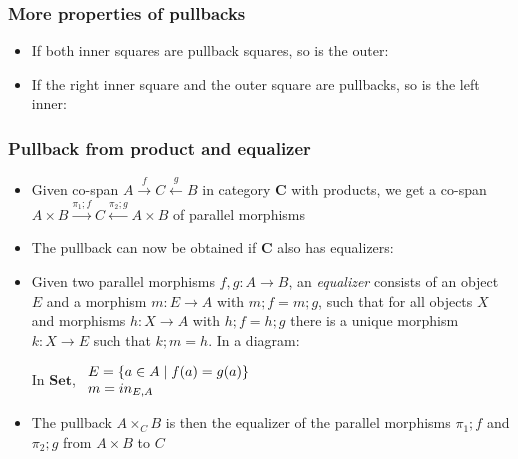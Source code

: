 \documentclass[handout]{beamer}
\newcommand{\bfsf}[1]{{\boldsymbol{#1}}}
\newcommand{\Set}{\bfsf{Set}}
\newcommand{\CC}{\bfsf{C}}
\begin{document}
\frame
  {   
    \frametitle{More properties of pullbacks}\label{Ch4:PullbPropMore}

 \begin{itemize}[<+->]
\item If both inner squares are pullback squares, so is the outer:
\item If the right inner square and the outer square are pullbacks, so is the left inner:
 \end{itemize}

 }


\frame
  {   
    \frametitle{Pullback from product and equalizer}\label{Ch4:PullbProdEq}

 \begin{itemize}[<+->]
\item Given co-span $A\stackrel{f}{\to} C\stackrel{g}{\leftarrow}B$ in 
category $\CC$ with products, we get a co-span
$A\times B\stackrel{\pi_1;f}{\to} C\stackrel{\pi_2;g}{\leftarrow}A\times B$
of parallel morphisms
\item The pullback can now be obtained if $\CC$ also has equalizers:
\item Given two parallel morphisms $f,g: A\to B$, an \emph{equalizer}
consists of an object $E$ and a morphism $m:E\to A$ with $m;f=m;g$,
such that for all objects $X$ and morphisms $h:X\to A$ with $h;f=h;g$
there is a unique morphism $k: X\to E$ such that $k;m = h$. In a diagram:
In $\Set$, %
$\begin{array}{ll}E=\{a\in A\mid f(a)=g(a)\}\\m=in_{E,A}\end{array}$
\item The pullback $A\times_C B$ is then the equalizer of the parallel
morphisms $\pi_1;f$ and $\pi_2;g$ from $A\times B$ to $C$
 \end{itemize}

 }
\end{document}
